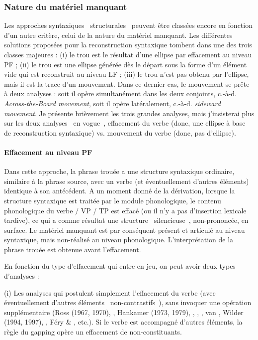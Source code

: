 \subsubsection{Nature du matériel manquant}
Les approches syntaxiques {\guillemotleft}~structurales~{\guillemotright} peuvent être classées encore en fonction d'un autre critère, celui de la nature du matériel manquant. Les différentes solutions proposées pour la reconstruction syntaxique tombent dans une des trois classes majeures : (i) le trou est le résultat d'une ellipse par effacement au niveau PF ; (ii) le trou est une ellipse générée dès le départ sous la forme d'un élément vide qui est reconstruit au niveau LF ; (iii) le trou n'est pas obtenu par l'ellipse, mais il est la trace d'un mouvement. Dans ce dernier cas, le mouvement se prête à deux analyses : soit il opère simultanément dans les deux conjoints, c.-à-d. \textit{Across-the-Board movement}, soit il opère latéralement, c.-à-d. \textit{sideward movement}. Je présente brièvement les trois grandes analyses, mais j'insisterai plus sur les deux analyses {\guillemotleft}~en vogue~{\guillemotright}, effacement du verbe (donc, une ellipse à base de reconstruction syntaxique) vs. mouvement du verbe (donc, pas d'ellipse).

\paragraph[Effacement au niveau PF]{Effacement au niveau PF}
Dans cette approche, la phrase trouée a une structure syntaxique ordinaire, similaire à la phrase source, avec un verbe (et éventuellement d'autres éléments) identique à son antécédent. A un moment donné de la dérivation, lorsque la structure syntaxique est traitée par le module phonologique, le contenu phonologique du verbe / VP / TP est effacé (ou il n'y a pas d'insertion lexicale tardive), ce qui a comme résultat une structure {\guillemotleft}~silencieuse~{\guillemotright}, non-prononcée, en surface. Le matériel manquant est par conséquent présent et articulé au niveau syntaxique, mais non-réalisé au niveau phonologique. L'interprétation de la phrase trouée est obtenue avant l'effacement.

En fonction du type d'effacement qui entre en jeu, on peut avoir deux types d'analyses :

(i) Les analyses qui postulent simplement l'effacement du verbe (avec éventuellement d'autres éléments {\guillemotleft}~non-contrastifs~{\guillemotright}), sans invoquer une opération supplémentaire (Ross (1967, 1970), \citet{Jackendoff1971}, Hankamer (1973, 1979), \citet{Stillings1975}, \citet{Kuno1976}, \citet{Neijt1979}, van \citet{Oirsouw1987}, Wilder (1994, 1997), \citet{Hartmann2000}, Féry \& \citet{Hartmann2005}, etc.). Si le verbe est accompagné d'autres éléments, la règle du gapping opère un effacement de non-constituants.



